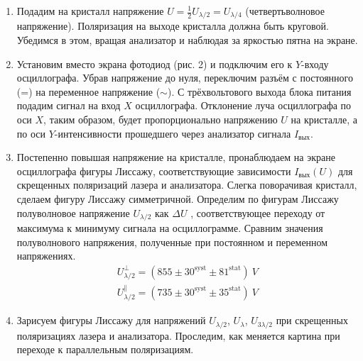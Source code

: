 \begin{enumerate}
    \item
    Подадим на кристалл напряжение $U = \frac{1}{2}U_{\lambda/2} = U_{\lambda/4}$ (четвертьволновое напряжение). Поляризация на выходе кристалла должна быть круговой. Убедимся в этом, вращая анализатор и наблюдая за яркостью пятна на экране.
    
    \item
    Установим вместо экрана фотодиод (рис. 2) и подключим его к $Y$-входу осциллографа. Убрав напряжение до нуля, переключим разъём с постоянного (=) на переменное напряжение ($\sim$). С трёхвольтового выхода блока питания подадим сигнал на вход $X$ осциллографа. Отклонение луча осциллографа по оси $X$, таким образом, будет пропорционально напряжению $U$ на кристалле, а по оси $Y$-интенсивности прошедшего через анализатор сигнала $I_{\text{вых}}$.
    
    \item 
    Постепенно повышая напряжение на кристалле, пронаблюдаем на экране осциллографа фигуры Лиссажу, соответствующие зависимости $I_{\text{вых}}(U)$ для скрещенных поляризаций лазера и анализатора. Слегка поворачивая кристалл, сделаем фигуру Лиссажу симметричной. Определим по фигурам Лиссажу полуволновое напряжение $U_{\lambda/2}$ как $\Delta U$ , соответствующее переходу от максимума к минимуму сигнала на осциллограмме. Сравним значения полуволнового напряжения, полученные при постоянном и переменном напряжениях.
    \begin{gather*}
    U_{\lambda/2}^{\perp} = (855 \pm 30^{\text{syst}} \pm 81^{\text{stat}})~V\\
    U_{\lambda/2}^{\parallel} = (735 \pm 30^{\text{syst}}\pm 35^{\text{stat}})~V
    \end{gather*}
    
    \item
    Зарисуем фигуры Лиссажу для напряжений $U_{\lambda/2}$, $U_{\lambda}$, $U_{3\lambda/2}$ при скрещенных поляризациях лазера и анализатора. Проследим, как меняется картина при переходе к параллельным поляризациям.

\end{enumerate}




